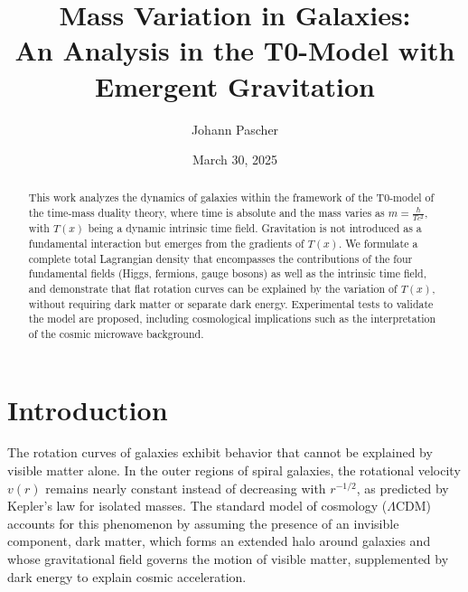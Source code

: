 \documentclass[a4paper,12pt]{article}
\newcommand{\Tfield}{T(x)}
\begin{document}
	
	\title{Mass Variation in Galaxies: \\An Analysis in the T0-Model with Emergent Gravitation}
	\author{Johann Pascher}
	\date{March 30, 2025}
	\maketitle
	
	\begin{abstract}
		This work analyzes the dynamics of galaxies within the framework of the T0-model of the time-mass duality theory, where time is absolute and the mass varies as \( m = \frac{\hbar}{T c^2} \), with \( \Tfield \) being a dynamic intrinsic time field. Gravitation is not introduced as a fundamental interaction but emerges from the gradients of \( \Tfield \). We formulate a complete total Lagrangian density that encompasses the contributions of the four fundamental fields (Higgs, fermions, gauge bosons) as well as the intrinsic time field, and demonstrate that flat rotation curves can be explained by the variation of \( \Tfield \), without requiring dark matter or separate dark energy. Experimental tests to validate the model are proposed, including cosmological implications such as the interpretation of the cosmic microwave background.
	\end{abstract}
	
	\tableofcontents
	\newpage
	
	\section{Introduction}
	
	The rotation curves of galaxies exhibit behavior that cannot be explained by visible matter alone. In the outer regions of spiral galaxies, the rotational velocity \( v(r) \) remains nearly constant instead of decreasing with \( r^{-1/2} \), as predicted by Kepler's law for isolated masses. The standard model of cosmology (\(\Lambda\)CDM) accounts for this phenomenon by assuming the presence of an invisible component, dark matter, which forms an extended halo around galaxies and whose gravitational field governs the motion of visible matter, supplemented by dark energy to explain cosmic acceleration.
	
\end{document}
